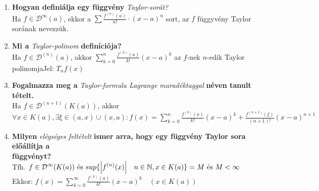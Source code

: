 \documentclass[a4paper,11pt]{article}
\begin{document}
	\def\D{\displaystyle\mathcal{D}}
	\def\N{\mathbb{N}}
	\begin{enumerate}
		\item\textbf{Hogyan definiálja egy függvény}
		\textit{Taylor-sorát?}\\[0.1cm]
		Ha $f\in\D^{\infty}(a)$, ekkor a $\sum\frac{f^{(n)}(a)}{n!} 
		\cdot(x-a)^{n}$ sort, az $f$ függyvény Taylor sorának nevezzük.
		\item\textbf{Mi a} \textit{Taylor-polinom} \textbf{definíciója?}\\[0.1cm]
		Ha $f\in\D^{(n)}(a)$, akkor $\sum\limits_{k=0}^{n} 
		\frac{f^{(k)}(a)}{k!}(x-a)^k$ az $f$-nek $n$-edik Taylor 
		polinomja\hspace{1cm}Jel: $T_nf(x)$
		\item\textbf{Fogalmazza meg a} \textit{Taylor-formula Lagrange maradéktaggal}
		\textbf{néven tanult tételt.}\\[0.1cm]
		Ha $f\in\D^{(n+1)}(K(a))$, akkor\\[0.1cm]$\forall x\in K(a),\exists\xi\in(a,x)
		\cup(x,a):f(x)=\sum\limits_{k=0}^{n}\frac{f^{(k)}(a)}{k!}(x-a)^k+
		\frac{f^{(n+1)}(\xi)}{(n+1)!}(x-a)^{n+1}$
		\item\textbf{Milyen} \textit{elégséges feltételt}
		\textbf{ismer arra, hogy egy függvény Taylor sora előállítja a\\függvényt?}
		\\[0.1cm]
		Tfh. $f\in\D^\infty(K(a))\text{ és }sup\{\abs{f^{(n)}(x)}\quad n\in\N,x\in 
		K(a)\}=M\text{ és }M<\infty$\\[0.2cm]Ekkor: $f(x)=\sum\limits_{k=0}^{\infty}\frac
		{f^{(k)}(a)}{k!}(x-a)^k\quad(x\in K(a))$
	\end{enumerate}
\end{document}
